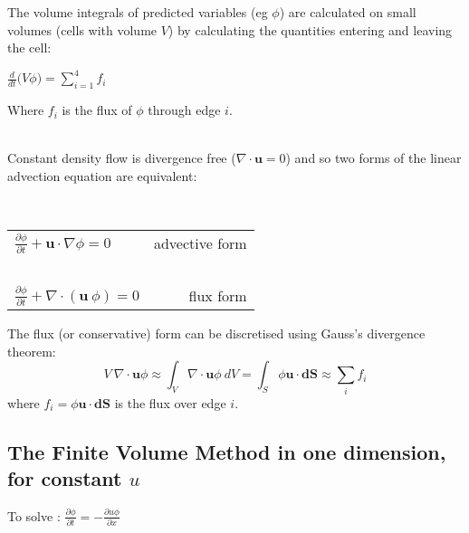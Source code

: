 The volume integrals of predicted variables (eg $\phi$) are calculated on small volumes (cells with volume $V$) by calculating the quantities entering and leaving the cell:

\begin{minipage}{0.49\linewidth}

\end{minipage}
\hfill
\begin{minipage}{0.49\linewidth}\raggedright
$\frac{d}{dt}\biggl(V\phi\biggr) = \sum_{i=1}^4 f_i$

Where $f_i$ is the flux of $\phi$ through edge $i$. 

\ \\

Constant density flow is divergence free ($\nabla\cdot\mathbf{u}=0$) and so two forms of the linear advection equation are equivalent:

\ \\

\begin{tabular}{lr}
$\frac{\partial \phi}{\partial t} + \mathbf{u}\cdot\nabla\phi = 0$ & advective form\\ \ \\
$\frac{\partial \phi}{\partial t} + \nabla\cdot (\mathbf{u}~\phi) = 0$ & flux form\\
\end{tabular}
\end{minipage}

The flux (or conservative) form can be discretised using Gauss's divergence theorem:
\begin{equation*}
V~ \nabla\cdot\mathbf{u}\phi \approx \int_V \nabla\cdot\mathbf{u}\phi~ dV
    = \int_S \phi\mathbf{u}\cdot \mathbf{dS}
    \approx \sum_i f_i
\end{equation*}
where $f_i = \phi\mathbf{u}\cdot \mathbf{dS}$ is the flux over edge $i$.

\subsection{The Finite Volume Method in one dimension, for constant $u$}

To solve : $\frac{\partial \phi}{\partial t} = -\frac{\partial u\phi}{\partial x}$
\hfill


